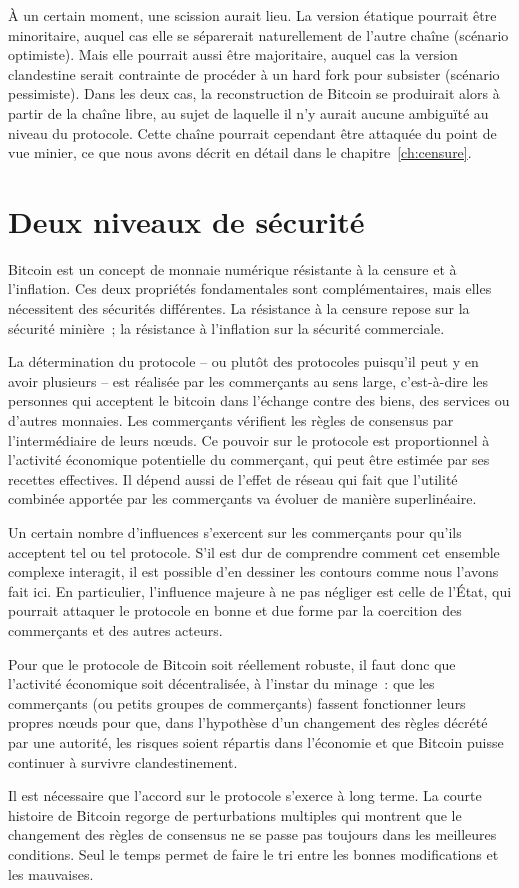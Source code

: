À un certain moment, une scission aurait lieu. La version étatique pourrait être minoritaire, auquel cas elle se séparerait naturellement de l'autre chaîne (scénario optimiste). Mais elle pourrait aussi être majoritaire, auquel cas la version clandestine serait contrainte de procéder à un hard fork pour subsister (scénario pessimiste). Dans les deux cas, la reconstruction de Bitcoin se produirait alors à partir de la chaîne libre, au sujet de laquelle il n'y aurait aucune ambiguïté au niveau du protocole. Cette chaîne pourrait cependant être attaquée du point de vue minier, ce que nous avons décrit en détail dans le chapitre~\ref{ch:censure}.

\section*{Deux niveaux de sécurité}

Bitcoin est un concept de monnaie numérique résistante à la censure et à l'inflation. Ces deux propriétés fondamentales sont complémentaires, mais elles nécessitent des sécurités différentes. La résistance à la censure repose sur la sécurité minière~; la résistance à l'inflation sur la sécurité commerciale.

La détermination du protocole -- ou plutôt des protocoles puisqu'il peut y en avoir plusieurs -- est réalisée par les commerçants au sens large, c'est-à-dire les personnes qui acceptent le bitcoin dans l'échange contre des biens, des services ou d'autres monnaies. Les commerçants vérifient les règles de consensus par l'intermédiaire de leurs nœuds. Ce pouvoir sur le protocole est proportionnel à l'activité économique potentielle du commerçant, qui peut être estimée par ses recettes effectives. Il dépend aussi de l'effet de réseau qui fait que l'utilité combinée apportée par les commerçants va évoluer de manière superlinéaire.

Un certain nombre d'influences s'exercent sur les commerçants pour qu'ils acceptent tel ou tel protocole. S'il est dur de comprendre comment cet ensemble complexe interagit, il est possible d'en dessiner les contours comme nous l'avons fait ici. En particulier, l'influence majeure à ne pas négliger est celle de l'État, qui pourrait attaquer le protocole en bonne et due forme par la coercition des commerçants et des autres acteurs.

Pour que le protocole de Bitcoin soit réellement robuste, il faut donc que l'activité économique soit décentralisée, à l'instar du minage~: que les commerçants (ou petits groupes de commerçants) fassent fonctionner leurs propres nœuds pour que, dans l'hypothèse d'un changement des règles décrété par une autorité, les risques soient répartis dans l'économie et que Bitcoin puisse continuer à survivre clandestinement.

Il est nécessaire que l'accord sur le protocole s'exerce à long terme. La courte histoire de Bitcoin regorge de perturbations multiples qui montrent que le changement des règles de consensus ne se passe pas toujours dans les meilleures conditions. Seul le temps permet de faire le tri entre les bonnes modifications et les mauvaises.